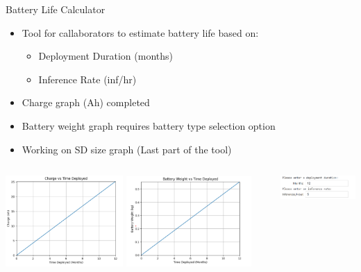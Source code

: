 \begin{frame}{Battery Life Calculator}
    \begin{itemize}
        \item Tool for callaborators to estimate battery life based on:
        \begin{itemize}
            \item Deployment Duration (months)
            \item Inference Rate (inf/hr)
        \end{itemize}
        \item Charge graph (Ah) completed
        \item Battery weight graph requires battery type selection option
        \item Working on SD size graph (Last part of the tool)
    \end{itemize}
    \begin{columns}
        \begin{column}{0.70\textwidth}
            \includegraphics[height=0.45\textheight,width=0.45\textwidth,keepaspectratio]{images/BatteryCharge.png}
            \hfill
            \includegraphics[height=0.45\textheight,width=0.48\textwidth,keepaspectratio]{images/BatteryWeight.png}
        \end{column}

        \begin{column}{0.30\textwidth}
            \vspace*{-1cm}
            \includegraphics[height=1\textheight,width=1\textwidth,keepaspectratio]{images/BatteryLifePrompt.png}
        \end{column}
    \end{columns}
\end{frame}

